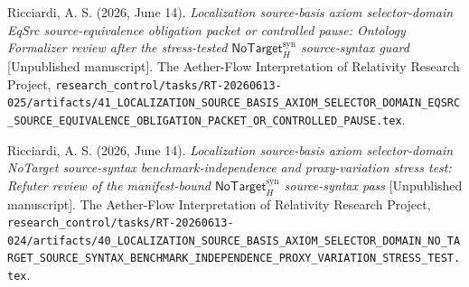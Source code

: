\documentclass[11pt]{article}
\newcommand{\NoTargetSyn}{\mathsf{NoTarget}_{H}^{\mathrm{syn}}}
\begin{document}
Ricciardi, A. S. (2026, June 14). \emph{Localization source-basis axiom
selector-domain EqSrc source-equivalence obligation packet or controlled
pause: Ontology Formalizer review after the stress-tested
\(\NoTargetSyn\) source-syntax guard} [Unpublished manuscript]. The
Aether-Flow Interpretation of Relativity Research Project,
\texttt{research\_control/tasks/RT-20260613-025/artifacts/41\_LOCALIZATION\_SOURCE\_BASIS\_AXIOM\_SELECTOR\_DOMAIN\_EQSRC\_SOURCE\_EQUIVALENCE\_OBLIGATION\_PACKET\_OR\_CONTROLLED\_PAUSE.tex}.

Ricciardi, A. S. (2026, June 14). \emph{Localization source-basis axiom
selector-domain NoTarget source-syntax benchmark-independence and
proxy-variation stress test: Refuter review of the manifest-bound
\(\NoTargetSyn\) source-syntax pass} [Unpublished manuscript]. The
Aether-Flow Interpretation of Relativity Research Project,
\texttt{research\_control/tasks/RT-20260613-024/artifacts/40\_LOCALIZATION\_SOURCE\_BASIS\_AXIOM\_SELECTOR\_DOMAIN\_NO\_TARGET\_SOURCE\_SYNTAX\_BENCHMARK\_INDEPENDENCE\_PROXY\_VARIATION\_STRESS\_TEST.tex}.
\end{document}
